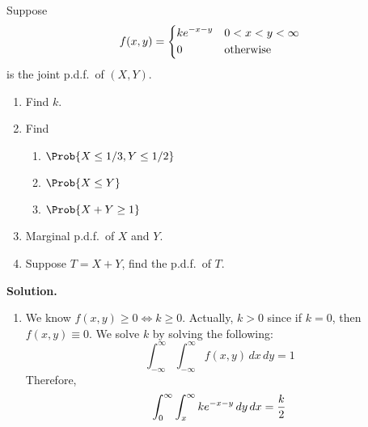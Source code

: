 \begin{Example}{}{}
    Suppose
    \[ f(x,y)=\begin{dcases}
            ke^{-x-y} & 0<x<y<\infty     \\
            0         & \text{otherwise}
        \end{dcases} \]
    is the joint p.d.f.\ of $ (X,Y) $.
    \begin{enumerate}[label=(\roman*)]
        \item Find $ k $.
        \item Find
              \begin{enumerate}[label=(\alph*)]
                  \item $ \Prob{X\le 1/3,Y\le 1/2} $
                  \item $ \Prob{X\le Y} $
                  \item $ \Prob{X+Y\ge 1} $
              \end{enumerate}
        \item Marginal p.d.f.\ of $ X $ and $ Y $.
        \item Suppose $ T=X+Y $, find the p.d.f.\ of $ T $.
    \end{enumerate}
    \textbf{Solution.}
    \begin{enumerate}[label=(\roman*)]
        \item We know $ f(x,y)\ge 0\iff k\ge 0 $. Actually,
              $ k>0 $ since if $ k=0 $, then $ f(x,y)\equiv 0 $.
              We solve $ k $ by solving the following:
              \[ \int_{-\infty}^{\infty} \int_{-\infty}^{\infty} f(x,y)\, d{x} \, d{y} =1 \]
              Therefore,
              \[
                  \int_{0}^{\infty} \int_{x}^{\infty} ke^{-x-y}\, d{y} \, d{x}                     \\
                  =\frac{k}{2}
              \]


\end{enumerate}
\end{Example}
